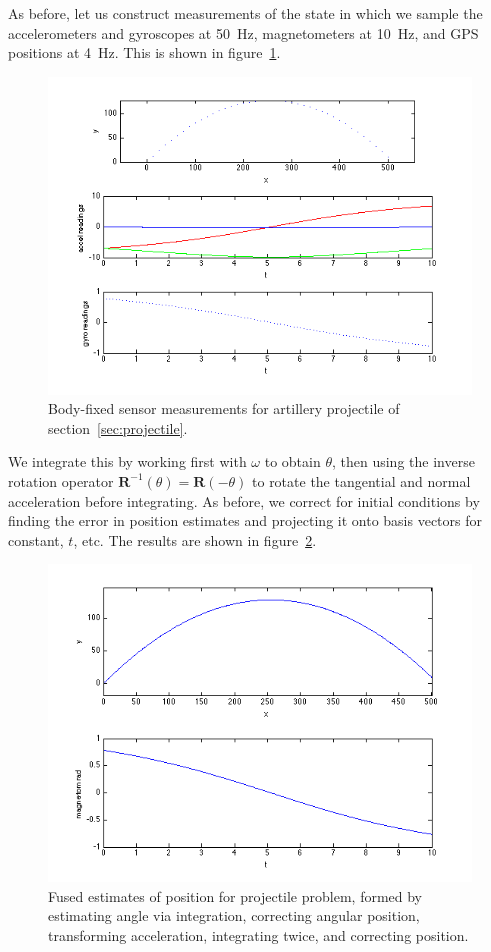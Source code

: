\documentclass{amsart}
\begin{document}
As before, let us construct measurements of the state in which we sample the accelerometers and gyroscopes at \SI{50}{\hertz}, magnetometers at \SI{10}{\hertz}, and GPS positions at \SI{4}{\hertz}.  This is shown in figure~\ref{fig:projectile}.
\begin{figure}
\includegraphics[width=\textwidth]{figures/foo2-raw.png}
\caption{Body-fixed sensor measurements for artillery projectile of section~\ref{sec:projectile}.}
\label{fig:projectile}
\end{figure}

We integrate this by working first with $\omega$ to obtain $\theta$, then using the inverse rotation operator $\mathbf{R}^{-1}(\theta) = \mathbf{R}(-\theta)$ to rotate the tangential and normal acceleration before integrating.  As before, we correct for initial conditions by finding the error in position estimates and projecting it onto basis vectors for constant, $t$, etc.  The results are shown in figure~\ref{fig:projectile-corr}.
\begin{figure}
\includegraphics[width=\textwidth]{figures/foo2-corr.png}
\caption{Fused estimates of position for projectile problem, formed by estimating angle via integration, correcting angular position, transforming acceleration, integrating twice, and correcting position.}
\label{fig:projectile-corr}
\end{figure}
\end{document}
